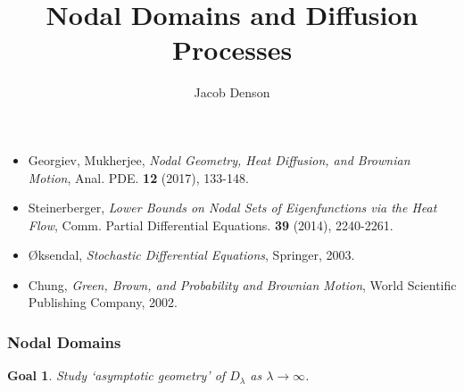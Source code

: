 \documentclass[usenames,dvipsnames,12pt]{beamer}
\title{Nodal Domains and Diffusion Processes}
\author{Jacob Denson}
\institute{University of Wisconsin Madison}
\newtheorem*{goal}{Goal}
\begin{document}
\maketitle

\begin{frame}

\begin{itemize}
    \item Georgiev, Mukherjee, \emph{Nodal Geometry, Heat Diffusion, and Brownian Motion}, Anal. PDE. {\bf 12} (2017), 133-148.

    \item Steinerberger, \emph{Lower Bounds on Nodal Sets of Eigenfunctions via the Heat Flow}, Comm. Partial Differential Equations. {\bf 39} (2014), 2240-2261.

    \item {\O}ksendal, \emph{Stochastic Differential Equations}, Springer, 2003.

    \item Chung, \emph{Green, Brown, and Probability and Brownian Motion}, World Scientific Publishing Company, 2002.
\end{itemize}

\end{frame}

\begin{frame}
    \frametitle{Nodal Domains}

    \begin{goal}
        Study `asymptotic geometry' of $D_\lambda$ as $\lambda \to \infty$.
    \end{goal}



        


\end{frame}
\end{document}

